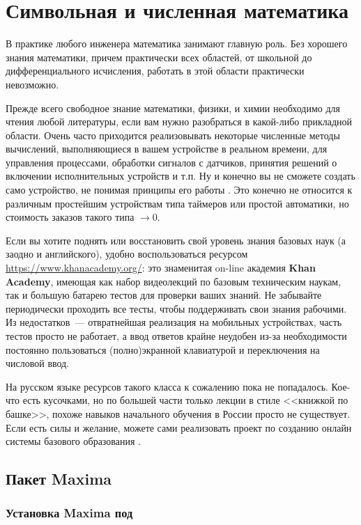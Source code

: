 \part{Символьная и численная математика}

В практике любого инженера математика занимают главную роль. Без хорошего знания
математики, причем практически всех областей, от школьной до дифференциального
исчисления, работать в этой области практически невозможно.

Прежде всего свободное знание математики, физики, и химии необходимо для чтения
любой литературы, если вам нужно разобраться в какой-либо прикладной области.
Очень часто приходится реализовывать некоторые численные методы вычислений,
выполняющиеся в вашем устройстве в реальном времени, для управления процессами,
обработки сигналов с датчиков, принятия решений о включении исполнительных
устройств и т.п. Ну и конечно вы не сможете создать само устройство, не понимая
принципы его работы \smiley. Это конечно не относится к различным простейшим
устройствам типа таймеров или простой автоматики, но стоимость заказов такого
типа $\rightarrow 0$.

Если вы хотите поднять или восстановить свой уровень знания базовых наук (а
заодно и английского), удобно воспользоваться ресурсом
\url{https://www.khanacademy.org/}: это знаменитая on-line академия \textbf{Khan
Academy}, имеющая как набор видеолекций по базовым техническим наукам, так и
большую батарею тестов для проверки ваших знаний. Не забывайте периодически
проходить все тесты, чтобы поддерживать свои знания рабочими. Из недостатков\
--- отвратнейшая реализация на мобильных устройствах, часть тестов просто не
работает, а ввод ответов крайне неудобен из-за необходимости постоянно
пользоваться (полно)экранной клавиатурой и переключения на числовой ввод.

На русском языке ресурсов такого класса к сожалению пока не попадалось.
Кое-что есть кусочками, но по большей части только лекции в стиле <<книжкой по
башке>>, похоже навыков начального обучения в России просто не существует. Если
есть силы и желание, можете сами реализовать проект по созданию онлайн системы
базового образования \smiley.

\chapter{Пакет Maxima}

\section{Установка Maxima под \win}

